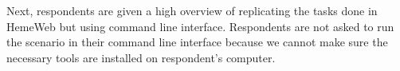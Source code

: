 Next, respondents are given a high overview of replicating the tasks done in HemeWeb but using command line interface. Respondents are not asked to run the scenario in their command line interface because we cannot make sure the necessary tools are installed on respondent's computer.

\vspace{1cm}

\noindent%
\begin{minipage}{\linewidth}%
 \label{fig:survey-s1-cli}%
\end{minipage}

\vspace{1cm}

\noindent%
\begin{minipage}{\linewidth}%
 \label{fig:survey-s1-cli-barrier}%
\end{minipage}


